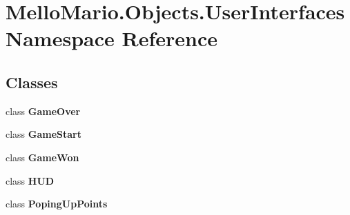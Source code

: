 \section{Mello\+Mario.\+Objects.\+User\+Interfaces Namespace Reference}
\label{namespaceMelloMario_1_1Objects_1_1UserInterfaces}
\subsection*{Classes}
\begin{DoxyCompactItemize}
\item 
class \textbf{ Game\+Over}
\item 
class \textbf{ Game\+Start}
\item 
class \textbf{ Game\+Won}
\item 
class \textbf{ H\+UD}
\item 
class \textbf{ Poping\+Up\+Points}
\end{DoxyCompactItemize}
